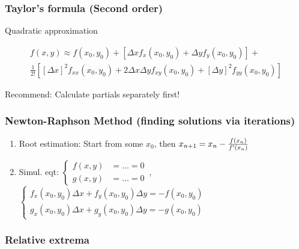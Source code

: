 \subsubsection*{Taylor's formula (Second order)}
Quadratic approximation
\begin{mdframed}[style=theorem]
	\begin{multline*}
		f(x, y) \approx f(x_0, y_0) + \left[\Delta x f_x(x_0, y_0) + \Delta y f_y(x_0, y_0)\right] + \\ \frac{1}{2!} \left[\left[\Delta x\right]^2 f_{xx}(x_0, y_0) + 2\Delta x\Delta y f_{xy}(x_0, y_0) + \left[\Delta y\right]^2 f_{yy}(x_0, y_0)\right]
	\end{multline*}
	
	\smallskip
	Recommend: Calculate partials separately first!
\end{mdframed}

\subsubsection*{Newton-Raphson Method (finding solutions via iterations)}

\begin{mdframed}[style=theorem]
	\begin{enumerate}[label=(\Alph*)]
		\item Root estimation: Start from some $x_0$, then $x_{n + 1} = x_n - \frac{f(x_n)}{f\textnormal{\textquotesingle}(x_n)}$
		\item Simul. eqt: $ \begin{cases}
		f(x, y) &= ... = 0 \\
		g(x, y) &= ... = 0
		\end{cases}\, $, $ \begin{cases}
		f_x(x_0, y_0)\Delta x + f_y(x_0, y_0)\Delta y = -f(x_0, y_0) \\
		g_x(x_0, y_0)\Delta x + g_y(x_0, y_0)\Delta y = -g(x_0, y_0)
		\end{cases}\, $
	\end{enumerate}
\end{mdframed}

\subsubsection*{Relative extrema}


